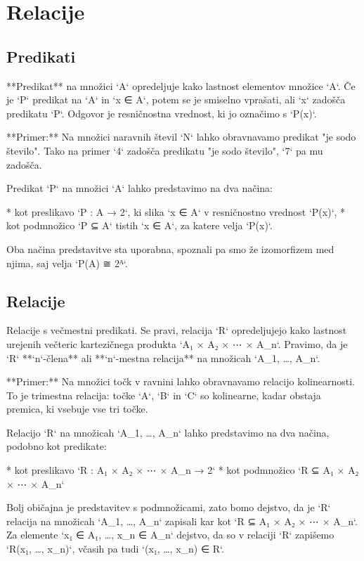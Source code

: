 \chapter{Relacije}

\section{Predikati}

**Predikat** na množici `A` opredeljuje kako lastnost elementov množice `A`. Če
je `P` predikat na `A` in `x ∈ A`, potem se je smiselno vprašati, ali `x`
zadošča predikatu `P`. Odgovor je resničnostna vrednost, ki jo označimo s `P(x)`.

**Primer:** Na množici naravnih števil `N` lahko obravnavamo predikat "je sodo
število". Tako na primer `4` zadošča predikatu "je sodo število", `7` pa mu zadošča.

Predikat `P` na množici `A` lahko predstavimo na dva načina:

* kot preslikavo `P : A → 2`, ki slika `x ∈ A` v resničnostno vrednost `P(x)`,
* kot podmnožico `P ⊆ A` tistih `x ∈ A`, za katere velja `P(x)`.

Oba načina predstavitve sta uporabna, spoznali pa smo že izomorfizem med njima,
saj velja `P(A) ≅ 2ᴬ`.

\section{Relacije}

Relacije s večmestni predikati. Se pravi, relacija `R` opredeljujejo kako
lastnost urejenih večteric kartezičnega produkta `A₁ × A₂ × ⋯ × A_n`. Pravimo, da
je `R` **`n`-člena** ali **`n`-mestna relacija** na množicah `A_1, …, A_n`.

**Primer:** Na množici točk v ravnini lahko obravnavamo relacijo kolinearnosti.
To je trimestna relacija: točke `A`, `B` in `C` so kolinearne, kadar obstaja
premica, ki vsebuje vse tri točke.

Relacijo `R` na množicah `A_1, …, A_n` lahko predstavimo na dva načina, podobno
kot predikate:

* kot preslikavo `R : A₁ × A₂ × ⋯ × A_n → 2`
* kot podmnožico `R ⊆ A₁ × A₂ × ⋯ × A_n`

Bolj običajna je predstavitev s podmnožicami, zato bomo dejstvo, da je `R`
relacija na množicah `A_1, …, A_n` zapisali kar kot `R ⊆ A₁ × A₂ × ⋯ × A_n`. Za
elemente `x₁ ∈ A₁, …, x_n ∈ A_n` dejstvo, da so v relaciji `R` zapišemo
`R(x₁, …, x_n)`, včasih pa tudi `(x₁, …, x_n) ∈ R`.

